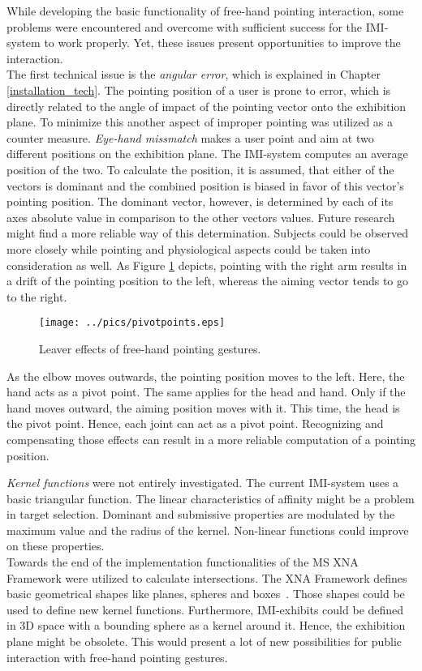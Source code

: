 While developing the basic functionality of free-hand pointing interaction, some problems were encountered and overcome with sufficient success for the \ac{IMI}-system to work properly. Yet, these issues present opportunities to improve the interaction.
\\
The first technical issue is the \textit{angular error}, which is explained in Chapter \ref{installation_tech}. The pointing position of a user is prone to error, which is directly related to the angle of impact of the pointing vector onto the exhibition plane. To minimize this another aspect of improper pointing was utilized as a counter measure. \textit{Eye-hand missmatch} makes a user point and aim at two different positions on the exhibition plane. The \ac{IMI}-system computes an average position of the two. To calculate the position, it is assumed, that either of the vectors is dominant and the combined position is biased in favor of this vector's pointing position. The dominant vector, however, is determined by each of its axes absolute value in comparison to the other vectors values. Future research might find a more reliable way of this determination. Subjects could be observed more closely while pointing and physiological aspects could be taken into consideration as well. As Figure \ref{fig:dominant_pointing} depicts, pointing with the right arm results in a drift of the pointing position to the left, whereas the aiming vector tends to go to the right.
\begin{figure}[H]%
\texttt{[image: ../pics/pivotpoints.eps]}%
\caption{Leaver effects of free-hand pointing gestures.}%
\label{fig:dominant_pointing} %
\end{figure}
As the elbow moves outwards, the pointing position moves to the left. Here, the hand acts as a pivot point. The same applies for the head and hand. Only if the hand moves outward, the aiming position moves with it. This time, the head is the pivot point. Hence, each joint can act as a pivot point. Recognizing and compensating those effects can result in a more reliable computation of a pointing position. 

\textit{Kernel functions} were not entirely investigated. The current \ac{IMI}-system uses a basic triangular function. The linear characteristics of affinity might be a problem in target selection. Dominant and submissive properties are modulated by the maximum value and the radius of the kernel. Non-linear functions could improve on these properties.
\\
Towards the end of the implementation functionalities of the \ac{MS} XNA Framework were utilized to calculate intersections. The XNA Framework defines basic geometrical shapes like planes, spheres and boxes~\cite{MSXNA}. Those shapes could be used to define new kernel functions. Furthermore, \ac{IMI}-exhibits could be defined in \ac{3D} space with a bounding sphere as a kernel around it. Hence, the exhibition plane might be obsolete. This would present a lot of new possibilities for public interaction with free-hand pointing gestures.

